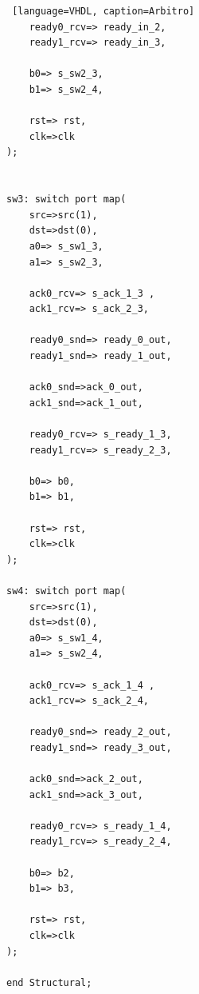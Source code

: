 \begin{lstlisting} [language=VHDL, caption=Arbitro]
    ready0_rcv=> ready_in_2,
    ready1_rcv=> ready_in_3,    
    
    b0=> s_sw2_3,
    b1=> s_sw2_4,
    
    rst=> rst,
    clk=>clk
);


sw3: switch port map(
    src=>src(1),
    dst=>dst(0),
    a0=> s_sw1_3,
    a1=> s_sw2_3,
    
    ack0_rcv=> s_ack_1_3 ,
    ack1_rcv=> s_ack_2_3,
    
    ready0_snd=> ready_0_out,
    ready1_snd=> ready_1_out,
    
    ack0_snd=>ack_0_out,
    ack1_snd=>ack_1_out,
  
    ready0_rcv=> s_ready_1_3,
    ready1_rcv=> s_ready_2_3,    
    
    b0=> b0,
    b1=> b1,
    
    rst=> rst,
    clk=>clk
);

sw4: switch port map(
    src=>src(1),
    dst=>dst(0),
    a0=> s_sw1_4,
    a1=> s_sw2_4,
    
    ack0_rcv=> s_ack_1_4 ,
    ack1_rcv=> s_ack_2_4,
    
    ready0_snd=> ready_2_out,
    ready1_snd=> ready_3_out,
    
    ack0_snd=>ack_2_out,
    ack1_snd=>ack_3_out,
  
    ready0_rcv=> s_ready_1_4,
    ready1_rcv=> s_ready_2_4,    
    
    b0=> b2,
    b1=> b3,
    
    rst=> rst,
    clk=>clk
);

end Structural;
\end{lstlisting}

